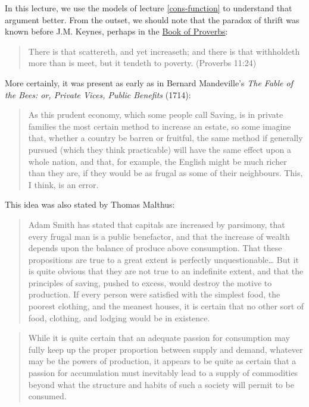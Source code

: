 \documentclass[]{book}
\begin{document}
In this lecture, we use the models of lecture \ref{cons-function} to
understand that argument better. From the outset, we should note that
the paradox of thrift was known before J.M. Keynes, perhaps in the
\href{https://en.wikipedia.org/wiki/Book_of_Proverbs}{Book of Proverbs}:

\begin{quote}
There is that scattereth, and yet increaseth; and there is that
withholdeth more than is meet, but it tendeth to poverty. (Proverbs
11:24)
\end{quote}

More certainly, it was present as early as in Bernard Mandeville's
\emph{The Fable of the Bees: or, Private Vices, Public Benefits} (1714):

\begin{quote}
As this prudent economy, which some people call Saving, is in private
families the most certain method to increase an estate, so some imagine
that, whether a country be barren or fruitful, the same method if
generally pursued (which they think practicable) will have the same
effect upon a whole nation, and that, for example, the English might be
much richer than they are, if they would be as frugal as some of their
neighbours. This, I think, is an error.
\end{quote}

This idea was also stated by Thomas Malthus:

\begin{quote}
Adam Smith has stated that capitals are increased by parsimony, that
every frugal man is a public benefactor, and that the increase of wealth
depends upon the balance of produce above consumption. That these
propositions are true to a great extent is perfectly
unquestionable\ldots{} But it is quite obvious that they are not true to
an indefinite extent, and that the principles of saving, pushed to
excess, would destroy the motive to production. If every person were
satisfied with the simplest food, the poorest clothing, and the meanest
houses, it is certain that no other sort of food, clothing, and lodging
would be in existence.
\end{quote}

\begin{quote}
While it is quite certain that an adequate passion for consumption may
fully keep up the proper proportion between supply and demand, whatever
may be the powers of production, it appears to be quite as certain that
a passion for accumulation must inevitably lead to a supply of
commodities beyond what the structure and habits of such a society will
permit to be consumed.
\end{quote}
\end{document}
